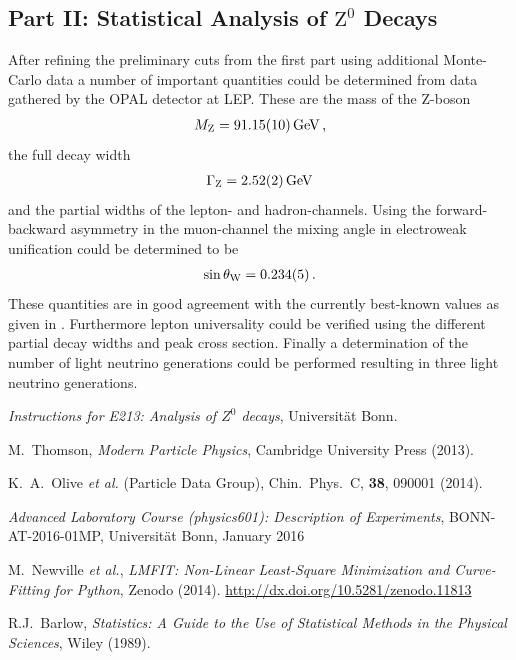 \documentclass[11pt, a4paper]{article}
\numberwithin{equation}{section}
\begin{document}
\subsection{Part II: Statistical Analysis of $\mathrm{Z}^0$ Decays}
After refining the preliminary cuts from the first part using additional Monte-Carlo data a number of important quantities could be determined from data gathered by the OPAL detector at LEP.
These are the mass of the Z-boson
\begin{align*}
	M_\mathrm{Z} = \SI{91.15 +- 0.10}{GeV} \,\text{,}
\end{align*}
the full decay width
\begin{align*}
	\Gamma_\mathrm{Z} = \SI{2.52 +- 0.02}{GeV}
\end{align*}
and the partial widths of the lepton- and hadron-channels.
Using the forward-backward asymmetry in the muon-channel the mixing angle in electroweak unification could be determined to be
\begin{align*}
	\sin\theta_\mathrm{W} = \num{0.234 +- 0.005} \,\text{.}
\end{align*}
These quantities are in good agreement with the currently best-known values as given in \cite{pdg}.
Furthermore lepton universality could be verified using the different partial decay widths and peak cross section.
Finally a determination of the number of light neutrino generations could be performed resulting in three light neutrino generations.

\FloatBarrier
\vspace{\fill}
\begin{thebibliography}{19}

	\emph{Instructions for E213: Analysis of $Z^0$ decays},
	Universität Bonn.
		
	M.\ Thomson, \emph{Modern Particle Physics},
	Cambridge University Press (2013).
	
	K.\ A.\ Olive \textit{et al.} (Particle Data Group),
	Chin.\ Phys.\ C, \textbf{38}, 090001 (2014).
	
	\emph{Advanced Laboratory Course (physics601): Description of Experiments}, BONN-AT-2016-01MP, Universität Bonn, January 2016

	M.\ Newville \textit{et al.},
	\emph{LMFIT: Non-Linear Least-Square Minimization and Curve-Fitting for Python}, Zenodo (2014). \url{http://dx.doi.org/10.5281/zenodo.11813}

	R.J.\ Barlow,
	\emph{Statistics: A Guide to the Use of Statistical Methods in the Physical Sciences},
	Wiley (1989).
	
\end{thebibliography}
\end{document}
